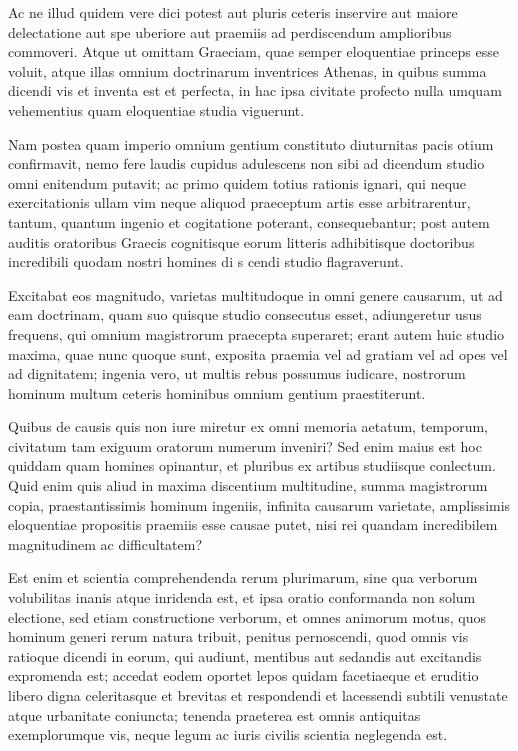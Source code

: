  Ac ne illud quidem vere dici potest aut pluris ceteris inservire aut maiore delectatione aut spe uberiore aut praemiis ad perdiscendum amplioribus commoveri. Atque ut omittam Graeciam, quae semper eloquentiae princeps esse voluit, atque illas omnium doctrinarum inventrices Athenas, in quibus summa dicendi vis et inventa est et perfecta, in hac ipsa civitate profecto nulla umquam vehementius quam eloquentiae studia viguerunt.

 Nam postea quam imperio omnium gentium constituto diuturnitas pacis otium confirmavit, nemo fere laudis cupidus adulescens non sibi ad dicendum studio omni enitendum putavit; ac primo quidem totius rationis ignari, qui neque exercitationis ullam vim neque aliquod praeceptum artis esse arbitrarentur, tantum, quantum ingenio et cogitatione poterant, consequebantur; post autem auditis oratoribus Graecis cognitisque eorum litteris adhibitisque doctoribus incredibili quodam nostri homines di s cendi studio flagraverunt.

 Excitabat eos magnitudo, varietas multitudoque in omni genere causarum, ut ad eam doctrinam, quam suo quisque studio consecutus esset, adiungeretur usus frequens, qui omnium magistrorum praecepta superaret; erant autem huic studio maxima, quae nunc quoque sunt, exposita praemia vel ad gratiam vel ad opes vel ad dignitatem; ingenia vero, ut multis rebus possumus iudicare, nostrorum hominum multum ceteris hominibus omnium gentium praestiterunt.

 Quibus de causis quis non iure miretur ex omni memoria aetatum, temporum, civitatum tam exiguum oratorum numerum inveniri? Sed enim maius est hoc quiddam quam homines opinantur, et pluribus ex artibus studiisque conlectum. Quid enim quis aliud in maxima discentium multitudine, summa magistrorum copia, praestantissimis hominum ingeniis, infinita causarum varietate, amplissimis eloquentiae propositis praemiis esse causae putet, nisi rei quandam incredibilem magnitudinem ac difficultatem?

 Est enim et scientia comprehendenda rerum plurimarum, sine qua verborum volubilitas inanis atque inridenda est, et ipsa oratio conformanda non solum electione, sed etiam constructione verborum, et omnes animorum motus, quos hominum generi rerum natura tribuit, penitus pernoscendi, quod omnis vis ratioque dicendi in eorum, qui audiunt, mentibus aut sedandis aut excitandis expromenda est; accedat eodem oportet lepos quidam facetiaeque et eruditio libero digna celeritasque et brevitas et respondendi et lacessendi subtili venustate atque urbanitate coniuncta; tenenda praeterea est omnis antiquitas exemplorumque vis, neque legum ac iuris civilis scientia neglegenda est.

